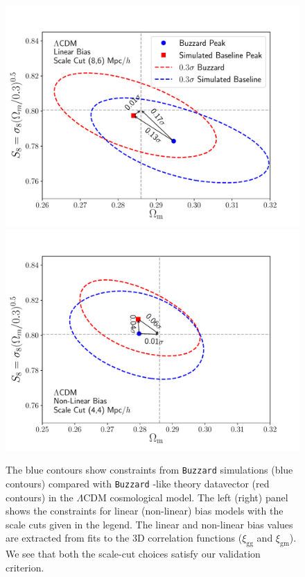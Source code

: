 \documentclass[aps, prd,twocolumn,superscriptaddress,nofootinbib,preprintnumbers]{revtex4-1}
\newcommand{\xigg}{\ensuremath{\xi_{\mathrm{gg}}} }
\newcommand{\xigm}{\ensuremath{\xi_{\mathrm{gm}}} }
\newcommand{\buzzard}{\texttt{Buzzard} }
\newcommand{\IR}[1]{{\color{red}[\textbf{Note for IR}: #1]}}
\begin{document}
\begin{figure}
\includegraphics[width=\columnwidth]{figs/Buzzard_linbias86_2x2pt_lcdm.pdf}
\includegraphics[width=\columnwidth]{figs/Buzzard_nlbias44_2x2pt_lcdm.pdf}
\caption[]{The blue contours show constraints from \buzzard simulations (blue contours) compared with  \buzzard-like theory datavector (red contours) in the $\Lambda$CDM cosmological model.
The left (right) panel shows the constraints for linear (non-linear) bias models with the scale cuts given in the legend. The linear and non-linear bias values are extracted from fits to the 3D correlation functions ($\xigg$ and $\xigm$). We see that both the scale-cut choices satisfy our validation criterion. 
}
\label{fig:bcc_des_lcdm}
\end{figure}
\end{document}

